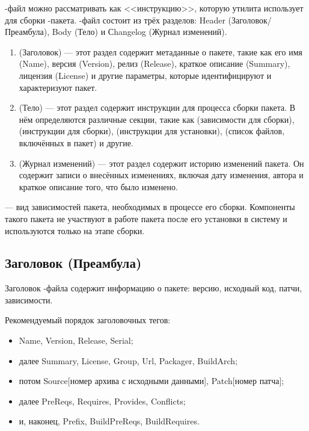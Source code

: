-файл можно рассматривать как <<инструкцию>>, которую утилита  использует для сборки -пакета.
-файл состоит из трёх разделов: Header (Заголовок/Преамбула), Body (Тело) и Сhangelog (Журнал изменений).
\begin{enumerate}
	\item {} (Заголовок) --- этот раздел содержит метаданные о пакете, такие как его имя (Name),
		версия (Version), релиз (Release), краткое описание (Summary), лицензия (License) и другие
		параметры, которые идентифицируют и характеризуют пакет.
	\item {} (Тело) --- этот раздел содержит инструкции для процесса сборки пакета. В нём
		определяются различные секции, такие как  (зависимости для сборки),
		 (инструкции для сборки),  (инструкции для установки),
		 (список файлов, включённых в пакет) и другие.
	\item {} (Журнал изменений) --- этот раздел содержит историю изменений пакета.
		Он содержит записи о внесённых изменениях, включая дату изменения, автора и краткое
		описание того, что было изменено.
\end{enumerate}

 --- вид зависимостей пакета,
необходимых в процессе его сборки. Компоненты такого пакета не участвуют в работе пакета после его установки в
систему и используются только на этапе сборки.

\subsection*{Заголовок (Преамбула)}

Заголовок -файла содержит информацию о пакете: версию, исходный код, патчи, зависимости.

Рекомендуемый порядок заголовочных тегов:
\begin{itemize}
	\item Name, Version, Release, Serial;
	\item далее Summary, License, Group, Url, Packager, BuildArch;
	\item потом Source[номер архива с исходными данными], Patch[номер патча];
	\item далее PreReqs, Requires, Provides, Conflicts;
	\item и, наконец, Prefix, BuildPreReqs, BuildRequires.
\end{itemize}

